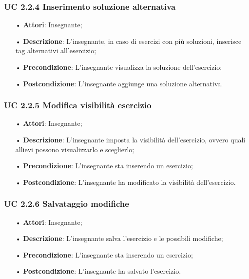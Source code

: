 \subsubsection{UC 2.2.4 Inserimento soluzione alternativa}
\begin{itemize}
	\item[•] \textbf{Attori}: Insegnante;
	\item[•] \textbf{Descrizione}: L'insegnante, in caso di esercizi con più soluzioni, inserisce tag alternativi all’esercizio;
	\item[•] \textbf{Precondizione}: L'insegnante visualizza la soluzione dell'esercizio;
	\item[•] \textbf{Postcondizione}: L'insegnante aggiunge una soluzione alternativa.
\end{itemize}

\subsubsection{UC 2.2.5 Modifica visibilità esercizio}
\begin{itemize}
	\item[•] \textbf{Attori}: Insegnante;
	\item[•] \textbf{Descrizione}: L'insegnante imposta la visibilità dell'esercizio, ovvero quali allievi possono visualizzarlo e sceglierlo;
	\item[•] \textbf{Precondizione}: L'insegnante sta inserendo un esercizio;
	\item[•] \textbf{Postcondizione}: L'insegnante ha modificato la visibilità dell'esercizio.
\end{itemize}
\subsubsection{UC 2.2.6 Salvataggio modifiche}
\begin{itemize}
	\item[•] \textbf{Attori}: Insegnante;
	\item[•] \textbf{Descrizione}: L'insegnante salva l'esercizio e le possibili modifiche;
	\item[•] \textbf{Precondizione}: L'insegnante sta inserendo un esercizio;
	\item[•] \textbf{Postcondizione}: L'insegnante ha salvato l'esercizio.
\end{itemize}
